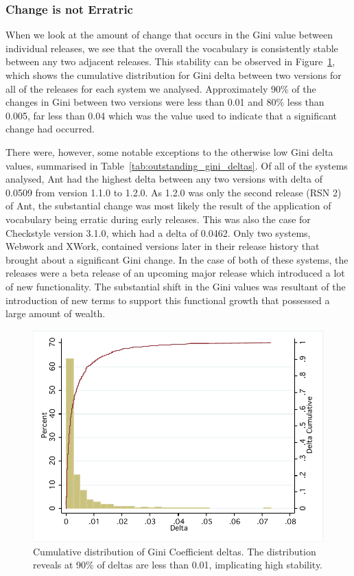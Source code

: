 
\subsubsection{Change is not Erratric} %
\label{ssub:change_is_not_erratric}

When we look at the amount of change that occurs in the Gini value between individual releases, we see that the overall the vocabulary is consistently stable between any two adjacent releases. This stability can be observed in Figure~\ref{fig:vocab-gini-delta-cumul}, which shows the cumulative distribution for Gini delta between two versions for all of the releases for each system we analysed. Approximately 90\% of the changes in Gini between two versions were less than 0.01 and 80\% less than 0.005, far less than 0.04 which was the value used to indicate that a significant change had occurred.

There were, however, some notable exceptions to the otherwise low Gini delta values, summarised in Table~\ref{tab:outstanding_gini_deltas}. Of all of the systems analysed, Ant had the highest delta between any two versions with delta of 0.0509 from version 1.1.0 to 1.2.0. As 1.2.0 was only the second release (RSN 2) of Ant, the substantial change was most likely the result of the application of vocabulary being erratic during early releases. This was also the case for Checkstyle version 3.1.0, which had a delta of 0.0462. Only two systems, Webwork and XWork, contained versions later in their release history that brought about a significant Gini change. In the case of both of these systems, the releases were a beta release of an upcoming major release which introduced a lot of new functionality. The substantial shift in the Gini values was resultant of the introduction of new terms to support this functional growth that possessed a large amount of wealth.

\begin{figure}[t]
\centering
\includegraphics[width=\textwidth]{Figures/Vocab-GiniDeltaCumulFreq.pdf}
\caption{Cumulative distribution of Gini Coefficient deltas. The distribution reveals at 90\% of deltas are less than 0.01, implicating high stability.}
\label{fig:vocab-gini-delta-cumul}
\end{figure}

